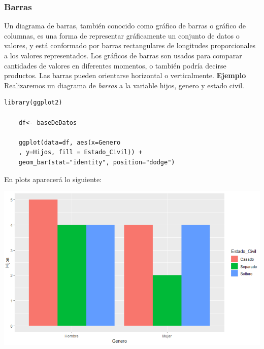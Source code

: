 \documentclass[12pt,hidelinks]{article}
\begin{document}
	\subsubsection{Barras}
	Un diagrama de barras, también conocido como gráfico de barras o gráfico de columnas, es una forma de representar gráficamente un conjunto de datos o valores, y está conformado por barras rectangulares de longitudes proporcionales a los valores representados. Los gráficos de barras son usados para comparar cantidades de valores en diferentes momentos, o también podría decirse productos. Las barras pueden orientarse horizontal o verticalmente. \textbf{Ejemplo} Realizaremos un diagrama de \textit{barras} a la variable hijos, genero y estado civil.
	\begin{lstlisting}[frame=single]
	library(ggplot2)
	
	df<- baseDeDatos
	
	ggplot(data=df, aes(x=Genero
	, y=Hijos, fill = Estado_Civil)) + 
	geom_bar(stat="identity", position="dodge")
	\end{lstlisting}
	En plots aparecerá lo siguiente:
	\begin{center}
		\includegraphics[width = 14cm]{images/2/GraficaBarras.PNG}
	\end{center}
\end{document}
